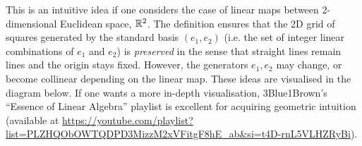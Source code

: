 \documentclass[../linear_algebra_and_groups.tex]{subfiles}
\begin{document}
This is an intuitive idea if one considers the case of linear maps between 2-dimensional Euclidean space, $\mathbb{R}^2$. The definition ensures that the 2D grid of squares generated by the standard basis $(e_1,e_2)$ (i.e. the set of integer linear combinations of $e_1$ and $e_2$) is \textit{preserved} in the sense that straight lines remain lines and the origin stays fixed. However, the generators $e_1,e_2$ may change, or become collinear depending on the linear map.
These ideas are visualised in the diagram below. If one wants a more in-depth visualisation, 3Blue1Brown's ``Essence of Linear Algebra'' playlist is excellent for acquiring geometric intuition (available at \url{https://youtube.com/playlist?list=PLZHQObOWTQDPD3MizzM2xVFitgF8hE_ab&si=t4D-rnL5VLHZRyBi}).
\begin{center}
\end{center}
\end{document}
